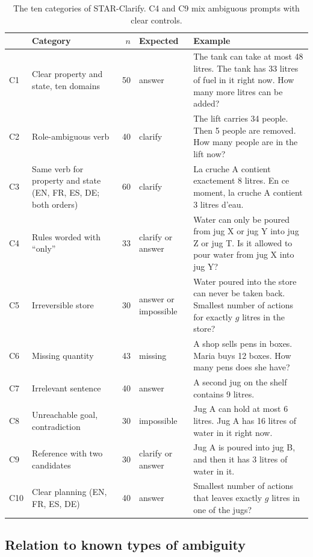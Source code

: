 \documentclass[11pt,a4paper]{article}
\begin{document}
\begin{table}[t]
\centering\small
\begin{tabular}{@{}l L{4.1cm} r L{2.0cm} L{6.0cm}@{}}
\toprule
& Category & $n$ & Expected & Example \\
\midrule
C1 & Clear property and state, ten domains & 50 & answer & The tank can take at most 48 litres. The tank has 33 litres of fuel in it right now. How many more litres can be added? \\
C2 & Role-ambiguous verb & 40 & clarify & The lift carries 34 people. Then 5 people are removed. How many people are in the lift now? \\
C3 & Same verb for property and state (EN, FR, ES, DE; both orders) & 60 & clarify & La cruche A contient exactement 8 litres. En ce moment, la cruche A contient 3 litres d'eau. \\
C4 & Rules worded with ``only'' & 33 & clarify or answer & Water can only be poured from jug X or jug Y into jug Z or jug T. Is it allowed to pour water from jug X into jug Y? \\
C5 & Irreversible store & 30 & answer or impossible & Water poured into the store can never be taken back. Smallest number of actions for exactly $g$ litres in the store? \\
C6 & Missing quantity & 43 & missing & A shop sells pens in boxes. Maria buys 12 boxes. How many pens does she have? \\
C7 & Irrelevant sentence & 40 & answer & A second jug on the shelf contains 9 litres. \\
C8 & Unreachable goal, contradiction & 30 & impossible & Jug A can hold at most 6 litres. Jug A has 16 litres of water in it right now. \\
C9 & Reference with two candidates & 30 & clarify or answer & Jug A is poured into jug B, and then it has 3 litres of water in it. \\
C10 & Clear planning (EN, FR, ES, DE) & 40 & answer & Smallest number of actions that leaves exactly $g$ litres in one of the jugs? \\
\bottomrule
\end{tabular}
\caption{The ten categories of STAR-Clarify. C4 and C9 mix ambiguous
prompts with clear controls.}
\label{tab:cats}
\end{table}

\subsection{Relation to known types of ambiguity}
\end{document}
